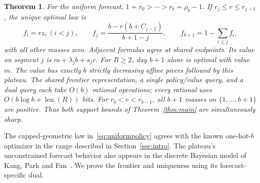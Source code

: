 \documentclass[manuscript,11pt,screen,nonacm]{acmart}
\newtheorem{theorem}{Theorem}
\begin{document}
\begin{theorem}\label{thm:uniform}
For the uniform forecast, $1=r_0>\cdots>r_b=\rho_b-1$.
If $r_j\le r\le r_{j-1}$, the unique optimal law is
\begin{equation}\label{eq:uniformpolicy}
 f_i=rz_i\ (i<j),\qquad
 f_j=\frac{b-r(b+C_{j-1})}{b+1-j},\qquad
 f_{b+1}=1-\sum_{i\le j}f_i,
\end{equation}
with all other masses zero. Adjacent formulas agree at shared endpoints.
Its value on segment $j$ is $m+\lambda_j b+s_jr$.
For $R\ge2$, day $b+1$ alone is optimal with value $m$.
The value has exactly $b$ strictly decreasing affine pieces followed by
this plateau. The shared frontier representation, a single policy/value
query, and a dual query each take $O(b)$ rational operations; every rational
uses $O(b\log b+\operatorname{len}(R))$ bits.
For $r_b<r<r_{b-1}$, all $b+1$ masses on $\{1,\ldots,b+1\}$ are positive.
Thus both support bounds of Theorem~\ref{thm:main} are simultaneously sharp.
\end{theorem}

The capped-geometric law in~\eqref{eq:uniformpolicy} agrees with the known
one-hot-$b$ optimizer in the range described in Section~\ref{sec:intro}.
The plateau's unconstrained forecast behavior also appears in the discrete
Bayesian model of Kang, Park and Fan~\cite{kang2025learningaugmentedskirentaldiscrete}.
We prove the frontier and uniqueness using its forecast-specific dual.
\end{document}
